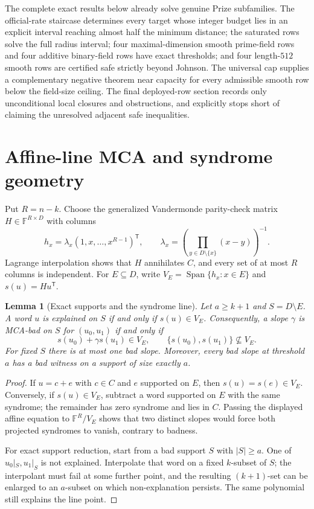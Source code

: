 \documentclass[11pt,a4paper]{amsart}
\numberwithin{equation}{section}
\newtheorem{lemma}[theorem]{Lemma}
\theoremstyle{remark}
\DeclareMathOperator{\Span}{Span}
\newcommand{\F}{\mathbb F}
\newcommand{\abs}[1]{\lvert#1\rvert}
\begin{document}
The complete exact results below already solve genuine Prize subfamilies.  The official-rate staircase determines every target whose integer budget lies in an explicit interval reaching almost half the minimum distance; the saturated rows solve the full radius interval; four maximal-dimension smooth prime-field rows and four additive binary-field rows have exact thresholds; and four length-$512$ smooth rows are certified safe strictly beyond Johnson.  The universal cap supplies a complementary negative theorem near capacity for every admissible smooth row below the field-size ceiling.  The final deployed-row section records only unconditional local closures and obstructions, and explicitly stops short of claiming the unresolved adjacent safe inequalities.
\section{Affine-line MCA and syndrome geometry}

Put $R=n-k$.  Choose the generalized Vandermonde parity-check matrix $H\in\F^{R\times D}$ with columns
\[
 h_x=\lambda_x(1,x,\ldots,x^{R-1})^{\mathsf T},\qquad
 \lambda_x=\left(\prod_{y\in D\setminus\{x\}}(x-y)\right)^{-1}.
\]
Lagrange interpolation shows that $H$ annihilates $C$, and every set of at most $R$ columns is independent.  For $E\subseteq D$, write $V_E=\Span\{h_x:x\in E\}$ and $s(u)=Hu^{\mathsf T}$.

\begin{lemma}[Exact supports and the syndrome line]\label{lem:syndrome}
Let $a\ge k+1$ and $S=D\setminus E$.  A word $u$ is explained on $S$ if and only if $s(u)\in V_E$.  Consequently, a slope $\gamma$ is MCA-bad on $S$ for $(u_0,u_1)$ if and only if
\[
 s(u_0)+\gamma s(u_1)\in V_E,
 \qquad \{s(u_0),s(u_1)\}\not\subseteq V_E.
\]
For fixed $S$ there is at most one bad slope.  Moreover, every bad slope at threshold $a$ has a bad witness on a support of size exactly $a$.
\end{lemma}

\begin{proof}
If $u=c+e$ with $c\in C$ and $e$ supported on $E$, then $s(u)=s(e)\in V_E$.  Conversely, if $s(u)\in V_E$, subtract a word supported on $E$ with the same syndrome; the remainder has zero syndrome and lies in $C$.  Passing the displayed affine equation to $\F^R/V_E$ shows that two distinct slopes would force both projected syndromes to vanish, contrary to badness.

For exact support reduction, start from a bad support $S$ with $\abs S\ge a$.  One of $u_0|_S,u_1|_S$ is not explained.  Interpolate that word on a fixed $k$-subset of $S$; the interpolant must fail at some further point, and the resulting $(k+1)$-set can be enlarged to an $a$-subset on which non-explanation persists.  The same polynomial still explains the line point.
\end{proof}
\end{document}
